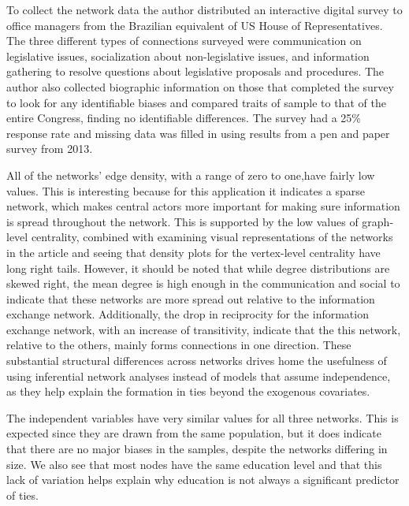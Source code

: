 \documentclass[fleqn,12pt]{wlscirep}
\begin{document}
To collect the network data the author distributed an interactive digital survey to office managers from the Brazilian equivalent of US House of Representatives. The three different types of connections surveyed were communication on legislative issues, socialization about non-legislative issues, and information gathering to resolve questions about legislative proposals and procedures. The author also collected biographic information on those that completed the survey to look for any identifiable biases and compared traits of sample to that of the entire Congress, finding no identifiable differences. The survey had a 25\% response rate and missing data was filled in using results from a pen and paper survey from 2013.

All of the networks' edge density, with a range of zero to one,have fairly low values. This is interesting because for this application it indicates a sparse network, which makes central actors more important for making sure information is spread throughout the network. This is supported by the low values of graph-level centrality, combined with examining visual representations of the networks in the article and seeing that density plots for the vertex-level centrality have long right tails. However, it should be noted that while degree distributions are skewed right, the mean degree is high enough in the communication and social to indicate that these networks are more spread out relative to the information exchange network. Additionally, the drop in reciprocity for the information exchange network, with an increase of transitivity, indicate that the this network, relative to the others, mainly forms connections in one direction. These substantial structural differences across networks drives home the usefulness of using inferential network analyses instead of models that assume independence, as they help explain the formation in ties beyond the exogenous covariates.

The independent variables have very similar values for all three networks. This is expected since they are drawn from the same population, but it does indicate that there are no major biases in the samples, despite the networks differing in size. We also see that most nodes have the same education level and that this lack of variation helps explain why education is not always a significant predictor of ties.\\
\end{document}
